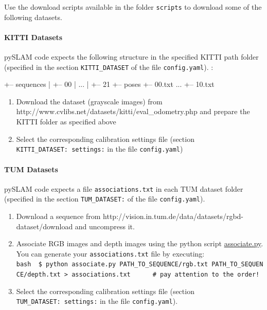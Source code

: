 \documentclass{article}
\newenvironment{Shaded}{\begin{snugshade}}{\end{snugshade}}
\newcommand{\NormalTok}[1]{\textcolor[rgb]{0.74,0.68,0.62}{#1}}
\providecommand{\tightlist}{%
  \setlength{\itemsep}{0pt}\setlength{\parskip}{0pt}}
\let\oldparagraph\paragraph
\renewcommand{\paragraph}[1]{\oldparagraph{#1}\mbox{}}
\begin{document}
Use the download scripts available in the folder \texttt{scripts} to
download some of the following datasets.

\hypertarget{kitti-datasets}{%
\paragraph{KITTI Datasets}\label{kitti-datasets}}

pySLAM code expects the following structure in the specified KITTI path
folder (specified in the section \texttt{KITTI\_DATASET} of the file
\texttt{config.yaml}). :

\begin{scriptsize}
\begin{Shaded}
\begin{Highlighting}[]
\NormalTok{+-- sequences}
\NormalTok{|   +-- 00}
\NormalTok{|   ...}
\NormalTok{|   +-- 21}
\NormalTok{+-- poses}
\NormalTok{    +-- 00.txt}
\NormalTok{    ...}
\NormalTok{    +-- 10.txt}
\end{Highlighting}
\end{Shaded}
\end{scriptsize}

\begin{enumerate}
\def\labelenumi{\arabic{enumi}.}
\item
  Download the dataset (grayscale images) from
  http://www.cvlibs.net/datasets/kitti/eval\_odometry.php and prepare
  the KITTI folder as specified above
\item
  Select the corresponding calibration settings file (section
  \texttt{KITTI\_DATASET:\ settings:} in the file \texttt{config.yaml})
\end{enumerate}

\hypertarget{tum-datasets}{%
\paragraph{TUM Datasets}\label{tum-datasets}}

pySLAM code expects a file \texttt{associations.txt} in each TUM dataset
folder (specified in the section \texttt{TUM\_DATASET:} of the file
\texttt{config.yaml}).

\begin{enumerate}
\def\labelenumi{\arabic{enumi}.}
\tightlist
\item
  Download a sequence from
  http://vision.in.tum.de/data/datasets/rgbd-dataset/download and
  uncompress it.
\item
  Associate RGB images and depth images using the python script
  \href{http://vision.in.tum.de/data/datasets/rgbd-dataset/tools}{associate.py}.
  You can generate your \texttt{associations.txt} file by executing:
  \texttt{bash\ \ \$\ python\ associate.py\ PATH\_TO\_SEQUENCE/rgb.txt\ PATH\_TO\_SEQUENCE/depth.txt\ \textgreater{}\ associations.txt\ \ \ \ \ \ \#\ pay\ attention\ to\ the\ order!}
\item
  Select the corresponding calibration settings file (section
  \texttt{TUM\_DATASET:\ settings:} in the file \texttt{config.yaml}).
\end{enumerate}
\end{document}
